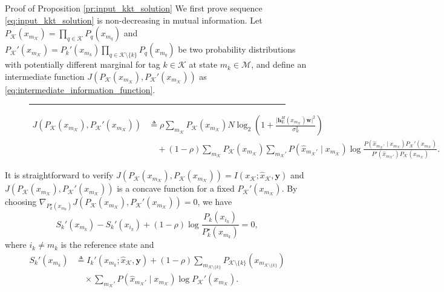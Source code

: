 \documentclass[journal]{IEEEtran}
\begin{document}
\begin{appendix}
	\begin{subsection}{Proof of Proposition \ref{pr:input_kkt_solution}}
		We first prove sequence \eqref{eq:input_kkt_solution} is non-decreasing in mutual information.
		Let $P_{\mathcal{K}}(x_{m_{\mathcal{K}}}) = \prod_{q \in \mathcal{K}} P_q(x_{m_q})$ and $P_{\mathcal{K}}'(x_{m_{\mathcal{K}}}) = P_k'(x_{m_k}) \prod_{q \in \mathcal{K} \setminus \{k\}} P_q(x_{m_q})$ be two probability distributions with potentially different marginal for tag $k \in \mathcal{K}$ at state $m_k \in \mathcal{M}$, and define an intermediate function $J \left( P_{\mathcal{K}}(x_{m_{\mathcal{K}}}),P_{\mathcal{K}}'(x_{m_{\mathcal{K}}}) \right)$ as \eqref{eq:intermediate_information_function}.
		\begin{figure}[!b]
			\hrule
			\begin{align}
				J \left( P_{\mathcal{K}}(x_{m_{\mathcal{K}}}),P_{\mathcal{K}}'(x_{m_{\mathcal{K}}}) \right)
				 & \triangleq \rho \sum_{m_{\mathcal{K}}} P_{\mathcal{K}}(x_{m_{\mathcal{K}}}) N \log_2 \left(1 + \frac{\lvert \boldsymbol{h}_{\mathrm{E}}^H(x_{m_{\mathcal{K}}}) \boldsymbol{w} \rvert^2}{\sigma_w^2}\right)\nonumber                                                                                                                          \\
				 & \quad + (1 - \rho) \sum_{m_{\mathcal{K}}} P_{\mathcal{K}}(x_{m_{\mathcal{K}}}) \sum_{m_{\mathcal{K}}'} P(\hat{x}_{m_{\mathcal{K}}'} \mid x_{m_{\mathcal{K}}}) \log \frac{P(\hat{x}_{m_{\mathcal{K}}'} \mid x_{m_{\mathcal{K}}}) P_{\mathcal{K}}'(x_{m_{\mathcal{K}}})}{P'(\hat{x}_{m_{\mathcal{K}}'}) P_{\mathcal{K}}(x_{m_{\mathcal{K}}})}.
				\label{eq:intermediate_information_function}
			\end{align}
		\end{figure}
		It is straightforward to verify $J \left( P_{\mathcal{K}}(x_{m_{\mathcal{K}}}),P_{\mathcal{K}}(x_{m_{\mathcal{K}}}) \right) = I(x_{\mathcal{K}};\hat{x}_{\mathcal{K}},\boldsymbol{y})$ and $J \left( P_{\mathcal{K}}(x_{m_{\mathcal{K}}}),P_{\mathcal{K}}'(x_{m_{\mathcal{K}}}) \right)$ is a concave function for a fixed $P_{\mathcal{K}}'(x_{m_{\mathcal{K}}})$.
		By choosing $\nabla_{P_k^\star(x_{m_k})} J \left( P_{\mathcal{K}}(x_{m_{\mathcal{K}}}),P_{\mathcal{K}}'(x_{m_{\mathcal{K}}}) \right) = 0$, we have
		\begin{equation}
			S_k'(x_{m_k}) - S_k'(x_{i_k}) + (1 - \rho) \log \frac{P_k(x_{i_k})}{P_k^\star(x_{m_k})} = 0,
			\label{eq:optimal_intermediate_information_condition}
		\end{equation}
		where $i_k \ne m_k$ is the reference state and
		\begin{align}
			S_k'(x_{m_k})
			 & \triangleq I_k'(x_{m_k};\hat{x}_{\mathcal{K}},\boldsymbol{y}) + (1 - \rho) \sum_{m_{\mathcal{K} \setminus \{k\}}} P_{\mathcal{K} \setminus \{k\}}(x_{m_{\mathcal{K} \setminus \{k\}}})\nonumber \\
			 & \quad \times \sum_{m_{\mathcal{K}}'} P(\hat{x}_{m_{\mathcal{K}}'} \mid x_{m_{\mathcal{K}}}) \log P_{\mathcal{K}}'(x_{m_{\mathcal{K}}}).
		\end{align}


\end{subsection}
\end{appendix}
\end{document}
